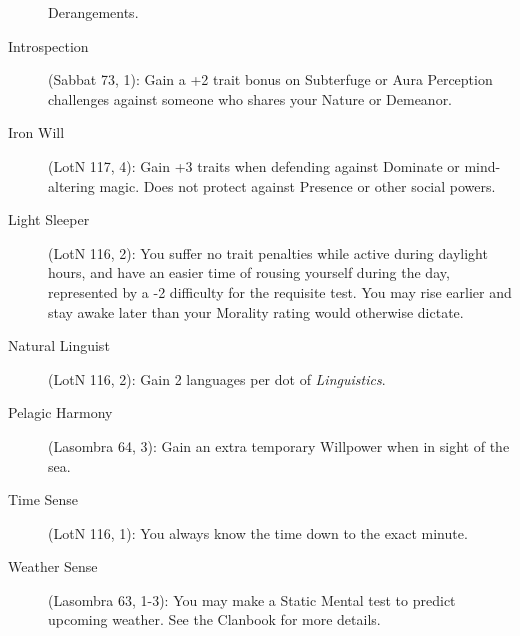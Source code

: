 \begin{description}
	Derangements.
	\item[Introspection] (Sabbat 73, 1):  Gain a +2 trait bonus on Subterfuge or Aura 
	Perception challenges against someone who shares your Nature or Demeanor.
	\item[Iron Will] (LotN 117, 4):  Gain +3 traits when defending against Dominate or 
	mind-altering magic.  Does not protect against Presence or other social powers.
	\item[Light Sleeper] (LotN 116, 2):  You suffer no trait penalties while active during daylight 
	hours, and have an easier time of rousing yourself during the day, represented by a -2 
	difficulty for the requisite test.  You may rise earlier and stay awake later than your Morality 
	rating would otherwise dictate.
	\item[Natural Linguist] (LotN 116, 2):  Gain 2 languages per dot of \emph{Linguistics}.
	\item[Pelagic Harmony] (Lasombra 64, 3):  Gain an extra temporary Willpower when in 
	sight of the sea.
	\item[Time Sense] (LotN 116, 1):  You always know the time down to the exact minute.
	\item[Weather Sense] (Lasombra 63, 1-3):  You may make a Static Mental test to predict 
	upcoming weather.  See the Clanbook for more details.
\end{description}

